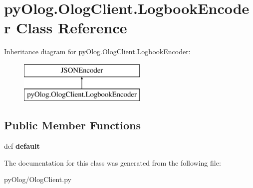 \hypertarget{classpyOlog_1_1OlogClient_1_1LogbookEncoder}{\section{py\-Olog.\-Olog\-Client.\-Logbook\-Encoder Class Reference}
\label{classpyOlog_1_1OlogClient_1_1LogbookEncoder}
}
Inheritance diagram for py\-Olog.\-Olog\-Client.\-Logbook\-Encoder\-:\begin{figure}[H]
\begin{center}
\leavevmode
\includegraphics[height=2.000000cm]{classpyOlog_1_1OlogClient_1_1LogbookEncoder}
\end{center}
\end{figure}
\subsection*{Public Member Functions}
\begin{DoxyCompactItemize}
\item 
\hypertarget{classpyOlog_1_1OlogClient_1_1LogbookEncoder_a8c72391004f85cbd0f749b0171ce0baa}{def {\bfseries default}}\label{classpyOlog_1_1OlogClient_1_1LogbookEncoder_a8c72391004f85cbd0f749b0171ce0baa}

\end{DoxyCompactItemize}


The documentation for this class was generated from the following file\-:\begin{DoxyCompactItemize}
\item 
py\-Olog/Olog\-Client.\-py\end{DoxyCompactItemize}
